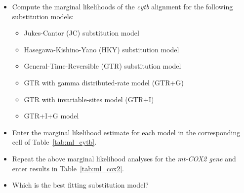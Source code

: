 \begin{itemize}
\item Compute the marginal likelihoods of the \textit{cytb} alignment for the following substitution models:
\begin{itemize}
\item Jukes-Cantor (JC) substitution model
\item Hasegawa-Kishino-Yano (HKY) substitution model
\item General-Time-Reversible (GTR) substitution model
\item GTR with gamma distributed-rate model (GTR+G)
\item GTR with invariable-sites model  (GTR+I)
\item GTR+I+G model
\end{itemize}
\item Enter the marginal likelihood estimate for each model in the corresponding cell of Table~\ref{tab:ml_cytb}.
\item Repeat the above marginal likelihood analyses for the \textit{mt-COX2 gene} and enter results in Table~\ref{tab:ml_cox2}.
\item Which is the best fitting substitution model?
\end{itemize}

